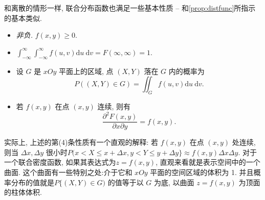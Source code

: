   和离散的情形一样, 联合分布函数也满足一些基本性质 -- 和\cref{prop:distfunc}所指示的基本类似. 
    \begin{itemize}
      \item \emph{非负.}  $f(x, y) \geqslant 0$.
      \item $\int_{-\infty}^{\infty} \int_{-\infty}^{\infty} f(u, v) \mathrm{d} u \mathrm{~d} v=F(\infty, \infty)=1$.
      \item 设 $G$ 是 $x O y$ 平面上的区域, 点 $(X, Y)$ 落在 $G$ 内的概率为
      $$
          P((X, Y) \in G)=\iint_G f(u, v) \mathrm{d} u \mathrm{~d} v .
      $$
      \item 若 $f(x, y)$ 在点 $(x, y)$ 连续, 则有
      $$
          \frac{\partial^2 F(x, y)}{\partial x \partial y}=f(x, y) .
      $$
    \end{itemize}

    实际上, 上述的第(4)条性质有一个直观的解释: 若 $f(x, y)$ 在点 $(x, y)$ 处连续, 则当 $\Delta x, \Delta y$ 很小时$P(x<X \leq x+\Delta x, y<Y \leq y+\Delta y\} \approx f(x, y) \Delta x \Delta y$. 对于一个联合密度函数, 如果其表达式为$z=f(x, y)$, 直观来看就是表示空间中的一个曲面. 这个曲面有一些特别之处:介于它和 $x O y$ 平面的空间区域的体积为 1. 并且概率分布的值就是$P\{(X, Y) \in G)$ 的值等于以 $G$ 为底, 以曲面 $z=f(x, y)$ 为顶面的柱体体积.

